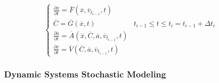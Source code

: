 \begin{equation}
\label{eq:auxiliaryVariables}
\left\{\begin{matrix}
\frac{\partial \overline{x} }{\partial t} = \overline{F}\left (  \overline{x},\overline{v}_{t_{i-1}}, t \right )  & \\ 
\overline{C} =  \overline{G}(\overline{x},t)  & t_{i-1} \leq t \leq  t_{i} =  t_{i-1} + \Delta  t_{i}\: \\ 
\frac{\partial \overline{a} }{\partial t} = \overline{A}\left (  \overline{x},\overline{C},\overline{a},\overline{v}_{t_{i-1}}, t \right ) \\
\frac{\partial \overline{v} }{\partial t} = \overline{V}\left (  \overline{C},\overline{a}, \overline{v}_{t_{i-1}}, t \right )  & 
\end{matrix}\right.
\end{equation}

\subsubsection{Dynamic Systems Stochastic Modeling}
%
